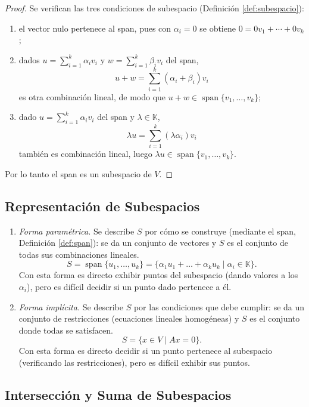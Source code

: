 \documentclass[11pt, a4paper]{article}
\begin{document}
\begin{proof}
Se verifican las tres condiciones de subespacio (Definición \ref{def:subespacio}):
\begin{enumerate}
    \item el vector nulo pertenece al span, pues con $\alpha_i = 0$ se obtiene $0 = 0v_1 + \cdots + 0v_k$;
    \item dados $u = \sum_{i=1}^k \alpha_i v_i$ y $w = \sum_{i=1}^k \beta_i v_i$ del span,
    \[
    u+w = \sum_{i=1}^k (\alpha_i+\beta_i) v_i
    \]
    es otra combinación lineal, de modo que $u+w \in \operatorname{span}\{v_1,\dots,v_k\}$;
    \item dado $u = \sum_{i=1}^k \alpha_i v_i$ del span y $\lambda \in \mathbb{K}$,
    \[
    \lambda u = \sum_{i=1}^k (\lambda \alpha_i) v_i
    \]
    también es combinación lineal, luego $\lambda u \in \operatorname{span}\{v_1,\dots,v_k\}$.
\end{enumerate}
Por lo tanto el span es un subespacio de $V$.
\end{proof}

\subsection{Representación de Subespacios}

\begin{enumerate}
    \item \textit{Forma paramétrica.} Se describe $S$ por cómo se construye (mediante el span,
    Definición \ref{def:span}): se da un conjunto de vectores y $S$ es el conjunto de todas sus
    combinaciones lineales.
    \[ S = \operatorname{span}\{u_1, \dots, u_k\} = \{ \alpha_1 u_1 + \dots + \alpha_k u_k \mid \alpha_i \in \mathbb{K} \}. \]
    Con esta forma es directo exhibir puntos del subespacio (dando valores a los $\alpha_i$), pero es difícil decidir si un punto dado pertenece a él.

    \item \textit{Forma implícita.} Se describe $S$ por las condiciones que debe cumplir: se da un
    conjunto de restricciones (ecuaciones lineales homogéneas) y $S$ es el conjunto donde todas se
    satisfacen.
    \[ S = \{ x \in V \mid Ax = 0 \}. \]
    Con esta forma es directo decidir si un punto pertenece al subespacio (verificando las restricciones), pero es difícil exhibir sus puntos.
\end{enumerate}

\subsection{Intersección y Suma de Subespacios}
\end{document}

